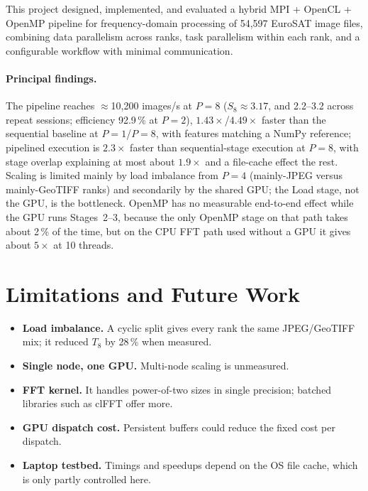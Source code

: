 \documentclass[a4paper,12pt]{report}
\begin{document}
This project designed, implemented, and evaluated a hybrid MPI + OpenCL + OpenMP
pipeline for frequency-domain processing of 54{,}597 EuroSAT image files, combining
data parallelism across ranks, task parallelism within each rank, and a
configurable workflow with minimal communication.

\paragraph{Principal findings.}
The pipeline reaches $\approx$10{,}200 images/s at $P=8$
($S_8 \approx 3.17$, and 2.2--3.2 across repeat sessions; efficiency 92.9\,\% at $P=2$), $1.43\times$/$4.49\times$
faster than the sequential baseline at $P=1$/$P=8$, with features matching
a NumPy reference; pipelined execution is $2.3\times$ faster than
sequential-stage execution at $P=8$, with stage overlap explaining at most
about $1.9\times$ and a file-cache effect the rest. Scaling is limited mainly by load imbalance from $P=4$
(mainly-JPEG versus mainly-GeoTIFF ranks) and secondarily by the shared
GPU; the Load stage, not the GPU, is the bottleneck. OpenMP has no measurable
end-to-end effect while the GPU runs Stages~2--3, because the only OpenMP stage on
that path takes about 2\,\% of the time, but on the CPU FFT path used without a GPU
it gives about $5\times$ at 10 threads.

\section{Limitations and Future Work}
\label{sec:limitations}\label{sec:future-work}

\begin{itemize}[noitemsep]
  \item \textbf{Load imbalance.} A cyclic split gives every rank the
    same JPEG/GeoTIFF mix; it reduced $T_8$ by 28\,\% when measured.
  \item \textbf{Single node, one GPU.} Multi-node scaling is unmeasured.
  \item \textbf{FFT kernel.} It handles power-of-two sizes in single
    precision; batched libraries such as clFFT \cite{amd2014} offer more.
  \item \textbf{GPU dispatch cost.} Persistent buffers could reduce the fixed cost
    per dispatch.
  \item \textbf{Laptop testbed.} Timings and speedups depend on the OS file
    cache, which is only partly controlled here.
\end{itemize}
\end{document}
